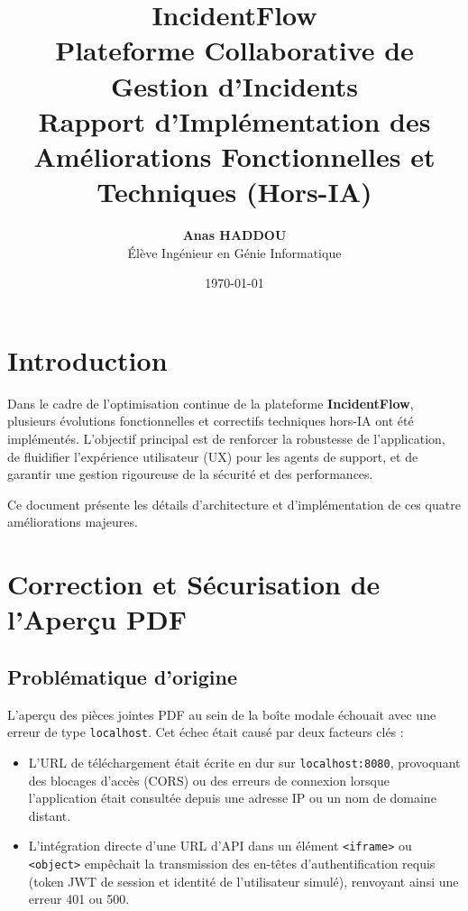 \documentclass[12pt,a4paper]{article}
\title{
    \textbf{\Huge IncidentFlow}\\[0.5cm]
    \Large Plateforme Collaborative de Gestion d'Incidents\\[1.5cm]
    \textbf{\Large Rapport d'Implémentation des Améliorations Fonctionnelles et Techniques (Hors-IA)}
    \vspace{1cm}
}
\author{\textbf{Anas HADDOU} \\ Élève Ingénieur en Génie Informatique}
\date{\today}
\begin{document}
\maketitle
\thispagestyle{empty}
\clearpage

\tableofcontents
\clearpage

\section{Introduction}
Dans le cadre de l'optimisation continue de la plateforme \textbf{IncidentFlow}, plusieurs évolutions fonctionnelles et correctifs techniques hors-IA ont été implémentés. L'objectif principal est de renforcer la robustesse de l'application, de fluidifier l'expérience utilisateur (UX) pour les agents de support, et de garantir une gestion rigoureuse de la sécurité et des performances.

Ce document présente les détails d'architecture et d'implémentation de ces quatre améliorations majeures.

\section{Correction et Sécurisation de l'Aperçu PDF}
\subsection{Problématique d'origine}
L'aperçu des pièces jointes PDF au sein de la boîte modale échouait avec une erreur de type \texttt{localhost}. Cet échec était causé par deux facteurs clés :
\begin{itemize}
    \item L'URL de téléchargement était écrite en dur sur \texttt{localhost:8080}, provoquant des blocages d'accès (CORS) ou des erreurs de connexion lorsque l'application était consultée depuis une adresse IP ou un nom de domaine distant.
    \item L'intégration directe d'une URL d'API dans un élément \texttt{<iframe>} ou \texttt{<object>} empêchait la transmission des en-têtes d'authentification requis (token JWT de session et identité de l'utilisateur simulé), renvoyant ainsi une erreur 401 ou 500.
\end{itemize}
\end{document}
